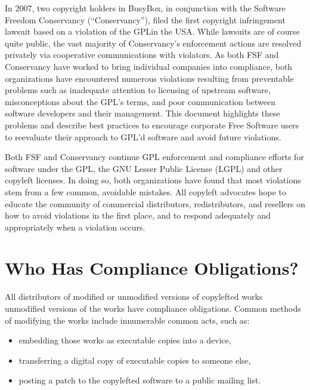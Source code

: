 In 2007, two copyright holders in BusyBox, in conjunction with the
Software Freedom Conservancy (``Conservancy''), filed the first copyright infringement lawsuit
based on a violation of the GPL\@ in the USA. While  lawsuits are of course
quite public, the vast majority of Conservancy's enforcement actions 
are resolved privately via
cooperative communications with violators.  As both FSF and Conservancy have worked to bring
individual companies into compliance, both organizations have encountered numerous
violations resulting from preventable problems such as inadequate
attention to licensing of upstream software, misconceptions about the
GPL's terms, and poor communication between software developers and their
management.  This document highlights these problems and describe
best practices to encourage corporate Free Software users to reevaluate their
approach to GPL'd software and avoid future violations.

Both FSF and Conservancy continue GPL enforcement and compliance efforts
for software under the GPL, the GNU Lesser
Public License (LGPL) and other copyleft licenses.  In doing so, both organizations have
found that most violations stem from a few common, avoidable mistakes.  All copyleft advocates  hope to educate the community of
commercial distributors, redistributors, and resellers on how to avoid
violations in the first place, and to respond adequately and appropriately
when a violation occurs.

\section{Who Has Compliance Obligations?}

All distributors of modified or unmodified versions of copylefted works
unmodified versions of the works have compliance obligations.  Common methods
of modifying the works include innumerable common acts, such as:

\begin{itemize}

  \item embedding those works as executable copies
    into a device,

  \item transferring a digital copy of executable copies to someone else,

  \item posting a patch to the copylefted software to a public mailing list.

\end{itemize}

